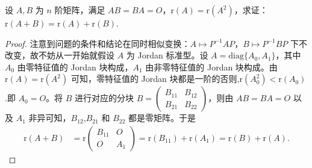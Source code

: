 \documentclass[../../main.tex]{subfiles}%
\begin{document}
\begin{example}
设 $A,B$ 为 $n$ 阶矩阵，满足 $AB = BA = O$，$\mathrm{r}(A) = \mathrm{r}(A^2)$，求证：$\mathrm{r}(A + B) = \mathrm{r}(A) + \mathrm{r}(B)$.
\end{example}
\begin{proof}
注意到问题的条件和结论在同时相似变换：$A\mapsto P^{-1}AP$，$B\mapsto P^{-1}BP$ 下不改变，故不妨从一开始就假设 $A$ 为 Jordan 标准型。设 $A = \mathrm{diag}\{A_0,A_1\}$，其中 $A_0$ 由零特征值的 Jordan 块构成，$A_1$ 由非零特征值的 Jordan 块构成。由 $\mathrm{r}(A) = \mathrm{r}(A^2)$ 可知，零特征值的 Jordan 块都是一阶的否则,$\mathrm{r}(A^2_0)<\mathrm{r}(A_0)$.即 $A_0 = O$。将 $B$ 进行对应的分块 $B = \begin{pmatrix}B_{11}&B_{12}\\B_{21}&B_{22}\end{pmatrix}$，则由 $AB = BA = O$ 以及 $A_1$ 非异可知，$B_{12}$,$B_{21}$ 和 $B_{22}$ 都是零矩阵。于是
\begin{align*}
\mathrm{r}(A + B) &= \mathrm{r}\begin{pmatrix}B_{11}&O\\O&A_1\end{pmatrix} = \mathrm{r}(B_{11}) + \mathrm{r}(A_1) = \mathrm{r}(B) + \mathrm{r}(A).
\end{align*}
\end{proof}
\end{document}
